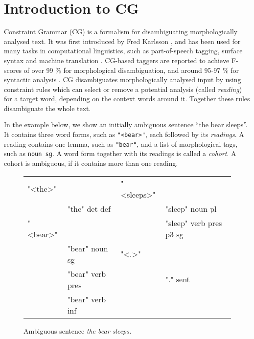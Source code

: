 \def\t#1{\texttt{#1}}

\section{Introduction to CG}
\label{sec:cg-intro}
 

Constraint Grammar (CG) is a formalism for 
disambiguating morphologically analysed text. 
It was first introduced by Fred Karlsson  
\cite{karlsson1990cgp,karlsson1995constraint}, and has been used for many tasks in
computational linguistics, such as part-of-speech tagging, surface syntax and
machine translation \cite{bick2011}.
CG-based taggers are reported to achieve F-scores of over 99 \% for morphological disambiguation, 
and around 95-97 \% for syntactic analysis \cite{bick2000palavras,bick2003hybridCG_PSG,bick2006spanish}.
CG disambiguates morphologically analysed input by using
constraint rules which can select or remove a potential analysis (called \emph{reading})
for a target word, depending on the context words around it. 
Together these rules disambiguate the whole text.


In the example below, we show an initially ambiguous sentence ``the bear
sleeps''. 
It contains three word forms, such as \t{"<bear>"}, each followed by its \emph{readings}.
A reading contains one lemma, such as \t{"bear"}, and a list of morphological tags, such as \t{noun sg}.
A word form together with its readings is called a \emph{cohort}. A cohort is ambiguous, if it contains more than one reading.

\begin{figure}[h]
\centering
\ttfamily
\begin{tabular}{p{0.6cm} l  p{0.6cm} l}
"<the>"  &                & "<sleeps>"        \\
    & "the" det def       &     & "sleep" noun pl \\
"<bear>" &                &     & "sleep" verb pres p3 sg \\
    & "bear" noun sg      & "<.>"                   \\
    & "bear" verb pres    &     & "." sent          \\
    & "bear" verb inf \\
\end{tabular}
\label{fig:theBearSleeps}
\caption{Ambiguous sentence {\em the bear sleeps.}}
\end{figure}


